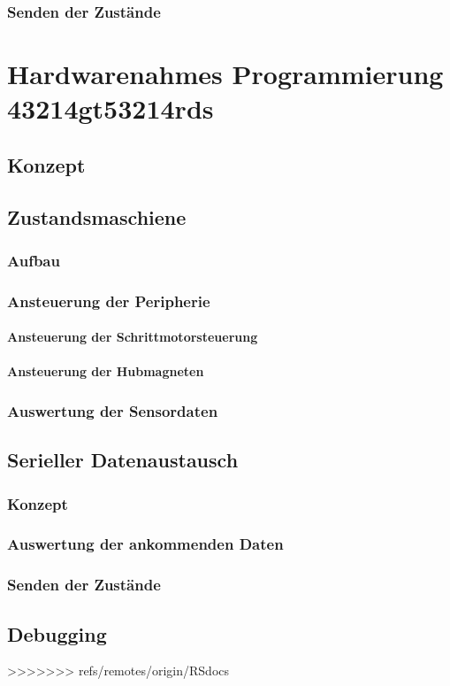 \subsubsection{Senden der Zustände}





\section{Hardwarenahmes Programmierung 43214gt53214rds}
\label{sec:board}
\subsection{Konzept}
\subsection{Zustandsmaschiene}
\subsubsection{Aufbau}
\subsubsection{Ansteuerung der Peripherie}
\paragraph{Ansteuerung der Schrittmotorsteuerung}
\paragraph{Ansteuerung der Hubmagneten}
\subsubsection{Auswertung der Sensordaten}

\subsection{Serieller Datenaustausch}
\subsubsection{Konzept}
\subsubsection{Auswertung der ankommenden Daten}
\subsubsection{Senden der Zustände}


\subsection{Debugging}



>>>>>>> refs/remotes/origin/RSdocs
